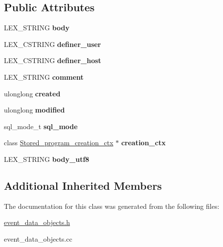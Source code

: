 \subsection*{Public Attributes}
\begin{DoxyCompactItemize}
\item 
\mbox{\label{classEvent__timed_acb76df53091c5226448754a40d2a3599}} 
L\+E\+X\+\_\+\+S\+T\+R\+I\+NG {\bfseries body}
\item 
\mbox{\label{classEvent__timed_a361cfe0d0abbbc8647849784a7492db9}} 
L\+E\+X\+\_\+\+C\+S\+T\+R\+I\+NG {\bfseries definer\+\_\+user}
\item 
\mbox{\label{classEvent__timed_ad9338fe9ad8bdb852105e9549a276286}} 
L\+E\+X\+\_\+\+C\+S\+T\+R\+I\+NG {\bfseries definer\+\_\+host}
\item 
\mbox{\label{classEvent__timed_a328da8bc70a486a1eb5c8a4e8445e363}} 
L\+E\+X\+\_\+\+S\+T\+R\+I\+NG {\bfseries comment}
\item 
\mbox{\label{classEvent__timed_a813425c13453510608434cc4abd10193}} 
ulonglong {\bfseries created}
\item 
\mbox{\label{classEvent__timed_af0a8a3e0850e499ff416d8537f865d71}} 
ulonglong {\bfseries modified}
\item 
\mbox{\label{classEvent__timed_a11a1fea2e4616d1a0bbc6d401f3c0a61}} 
sql\+\_\+mode\+\_\+t {\bfseries sql\+\_\+mode}
\item 
\mbox{\label{classEvent__timed_a52ef245d1c2ace68ce642a73897f70eb}} 
class \mbox{\hyperlink{classStored__program__creation__ctx}{Stored\+\_\+program\+\_\+creation\+\_\+ctx}} $\ast$ {\bfseries creation\+\_\+ctx}
\item 
\mbox{\label{classEvent__timed_ab64bb29ee97923185073b88aa2fa0132}} 
L\+E\+X\+\_\+\+S\+T\+R\+I\+NG {\bfseries body\+\_\+utf8}
\end{DoxyCompactItemize}
\subsection*{Additional Inherited Members}


The documentation for this class was generated from the following files\+:\begin{DoxyCompactItemize}
\item 
\mbox{\hyperlink{event__data__objects_8h}{event\+\_\+data\+\_\+objects.\+h}}\item 
event\+\_\+data\+\_\+objects.\+cc\end{DoxyCompactItemize}
